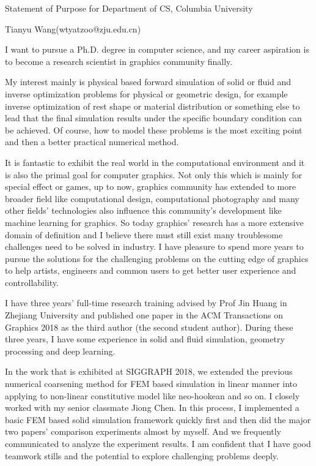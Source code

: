 \documentclass[a4paper,12pt]{article}
\begin{document}
\centerline{\large{Statement of Purpose for Department of CS, Columbia University}}
\vspace{2ex}
\centerline{\large{Tianyu Wang(wtyatzoo@zju.edu.cn)}}
\vspace{2ex}

I want to pursue a Ph.D. degree in computer science, and my career aspiration is to become a research scientist in graphics community finally.\vspace{1.2ex}

My interest mainly is physical based forward simulation of solid or fluid and inverse optimization problems for physical or geometric design, for example inverse optimization of rest shape or material distribution or something else to lead that the final simulation results under the specific boundary condition can be achieved. Of course, how to model these problems is the most exciting point and then a better practical numerical method.\vspace{1.2ex}

It is fantastic to exhibit the real world in the computational environment and it is also the primal goal for computer graphics. Not only this which is mainly for special effect or games, up to now, graphics community has extended to more broader field like computational design, computational photography and many other fields' technologies also influence this community's development like machine learning for graphics. So today graphics' research has a more extensive domain of definition and I believe there must still exist many troublesome challenges need to be solved in industry. I have pleasure to spend more years to pursue the solutions for the challenging problems on the cutting edge of graphics to help artists, engineers and common users to get better user experience and controllability. \vspace{1.2ex} 

I have three years' full-time research training advised by Prof Jin Huang in Zhejiang University and published one paper in the ACM Transactions on Graphics 2018 as the third author (the second student author). During these three years, I have some experience in solid and fluid simulation, geometry processing and deep learning.\vspace{1.2ex} 

In the work that is exhibited at SIGGRAPH 2018, we extended the previous numerical coarsening method for FEM based simulation in linear manner into applying to non-linear constitutive model like neo-hookean and so on. I closely worked with my senior classmate Jiong Chen. In this process, I implemented a basic FEM based solid simulation framework quickly first and then did the major two papers' comparison experiments almost by myself. And we frequently communicated to analyze the experiment results. I am confident that I have good teamwork stills and the potential to explore challenging problems deeply.\vspace{1.2ex}
\end{document}
